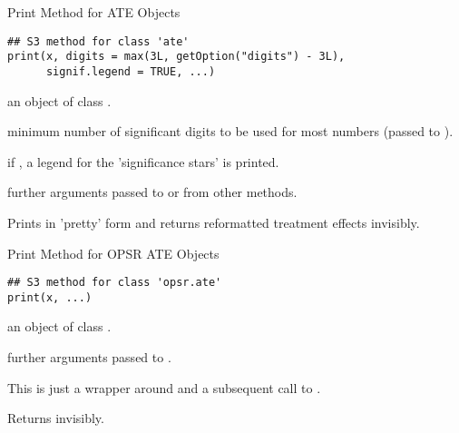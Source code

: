 %
\begin{Description}
Print Method for ATE Objects
\end{Description}
%
\begin{Usage}
\begin{verbatim}
## S3 method for class 'ate'
print(x, digits = max(3L, getOption("digits") - 3L),
      signif.legend = TRUE, ...)
\end{verbatim}
\end{Usage}
%
\begin{Arguments}
\begin{ldescription}
\item[\code{x}] an object of class .

\item[\code{digits}] minimum number of significant digits to be used for most numbers
(passed to ).

\item[\code{signif.legend}] if , a legend for the 'significance stars' is printed.

\item[\code{...}] further arguments passed to or from other methods.
\end{ldescription}
\end{Arguments}
%
\begin{Value}
Prints  in 'pretty' form and returns reformatted treatment effects
invisibly.
\end{Value}


%
\begin{Description}
Print Method for OPSR ATE Objects
\end{Description}
%
\begin{Usage}
\begin{verbatim}
## S3 method for class 'opsr.ate'
print(x, ...)
\end{verbatim}
\end{Usage}
%
\begin{Arguments}
\begin{ldescription}
\item[\code{x}] an object of class .

\item[\code{...}] further arguments passed to .
\end{ldescription}
\end{Arguments}
%
\begin{Details}
This is just a wrapper around  and a subsequent call to
.
\end{Details}
%
\begin{Value}
Returns  invisibly.
\end{Value}
%
\begin{SeeAlso}
\end{SeeAlso}

